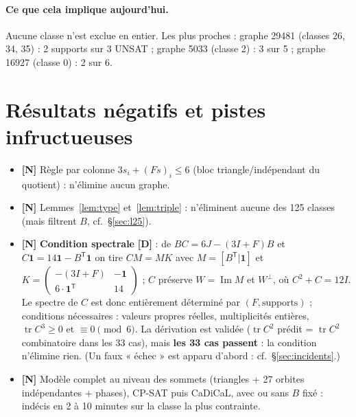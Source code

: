 \documentclass[11pt,a4paper]{article}
\theoremstyle{remark}
\newcommand{\tr}{\operatorname{tr}}
\newcommand{\st}[1]{\textbf{[#1]}}
\begin{document}
\paragraph{Ce que cela implique aujourd'hui.} Aucune classe n'est exclue en entier. Les plus proches : graphe 29481 (classes 26, 34, 35) : 2 supports sur 3
UNSAT ; graphe 5033 (classe 2) : 3 sur 5 ; graphe 16927 (classe 0) : 2 sur 6.

\section{Résultats négatifs et pistes infructueuses}\label{sec:neg}
\begin{itemize}[nosep]
\item \st{N} Règle par colonne $3s_i+(Fs)_i\le6$ (bloc triangle/indépendant du quotient) : n'élimine aucun graphe.
\item \st{N} Lemmes~\ref{lem:type} et~\ref{lem:triple} : n'éliminent aucune des 125 classes (mais filtrent $B$, cf.\ §\ref{sec:l25}).
\item \st{N} \textbf{Condition spectrale} \st{D} : de $BC=6J-(3I+F)B$ et $C\mathbf1=14\mathbf1-B^{\mathsf T}\mathbf1$ on tire $CM=MK$ avec $M=[B^{\mathsf T}|\mathbf1]$ et
$K=\begin{pmatrix}-(3I+F)&-\mathbf1\\6\cdot\mathbf1^{\mathsf T}&14\end{pmatrix}$ ; $C$ préserve $W=\operatorname{Im}M$ et $W^\perp$, où $C^2+C=12I$.
Le spectre de $C$ est donc entièrement déterminé par $(F,\text{supports})$ ; conditions nécessaires : valeurs propres réelles, multiplicités entières,
$\tr C^3\ge0$ et $\equiv0\pmod6$. La dérivation est validée ($\tr C^2$ prédit = $\tr C^2$ combinatoire dans les 33 cas), mais \textbf{les 33 cas passent} :
la condition n'élimine rien. (Un faux « échec » est apparu d'abord : cf.\ §\ref{sec:incidents}.)
\item \st{N} Modèle complet au niveau des sommets (triangles + 27 orbites indépendantes + phases), CP-SAT puis CaDiCaL, avec ou sans $B$ fixé :
indécis en 2 à 10 minutes sur la classe la plus contrainte.
\end{itemize}

\end{document}
